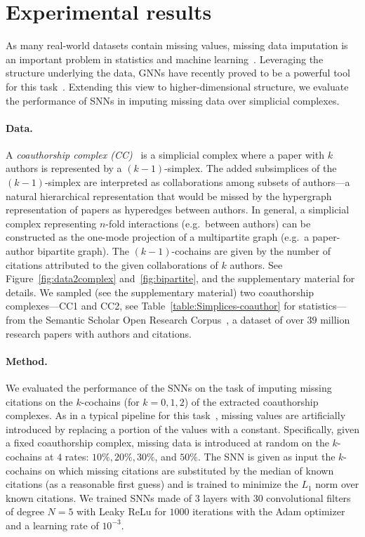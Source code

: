 \section{Experimental results}

As many real-world datasets contain missing values, missing data imputation is an important problem in statistics and machine learning~\cite{little1986statistical, nelwamondo2007missing}.
Leveraging the structure underlying the data, GNNs have recently proved to be a powerful tool for this task~\cite{spinelli2020neural}.
Extending this view to higher-dimensional structure, we evaluate the performance of SNNs in imputing missing data over simplicial complexes.

\paragraph{Data.}
A \emph{coauthorship complex (CC)}~\cite{patania2017} is a simplicial complex where a paper with $k$ authors is represented by a $(k-1)$-simplex.
The added subsimplices of the $(k-1)$-simplex are interpreted as collaborations among subsets of authors---a natural hierarchical representation that would be missed by the hypergraph representation of papers as hyperedges between authors.
In general, a simplicial complex representing $n$-fold interactions (e.g.\ between authors) can be constructed as the one-mode projection of a multipartite graph (e.g.\ a paper-author bipartite graph).
The $(k-1)$-cochains are given by the number of citations attributed to the given collaborations of $k$ authors.
See Figure~\ref{fig:data2complex} and~\ref{fig:bipartite}, and the supplementary material for details.
We sampled (see the supplementary material) two coauthorship complexes---CC1 and CC2, see Table~\ref{table:Simplices-coauthor} for statistics---from the Semantic Scholar Open Research Corpus~\cite{ammar18NAACL}, a dataset of over $39$ million research papers with authors and citations.

\paragraph{Method.}
We evaluated the performance of the SNNs on the task of imputing missing citations on the $k$-cochains (for $k=0,1,2$) of the extracted coauthorship complexes.
As in a typical pipeline for this task~\cite{nelwamondo2007missing}, missing values are artificially introduced by replacing a portion of the values with a constant.
Specifically, given a fixed coauthorship complex, missing data is introduced at random on the $k$-cochains at $4$ rates: $10\%, 20\%,  30\%$, and $50\%$.
The SNN is given as input the $k$-cochains on which missing citations are substituted by the median of known citations (as a reasonable first guess) and is trained to minimize the $L_1$ norm over known citations.
We trained SNNs made of $3$ layers with $30$ convolutional filters of degree $N=5$ with Leaky ReLu for $1000$ iterations with the Adam optimizer and a learning rate of $10^{-3}$.

